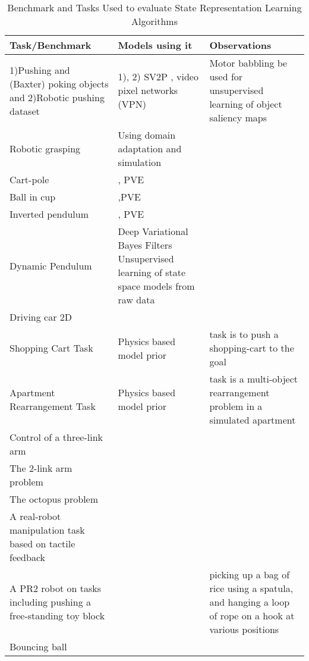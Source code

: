 \documentclass[a4paper]{article}
\begin{document}
\begin{table}[!htbp]%
\centering
\caption{Benchmark and Tasks Used to evaluate State Representation Learning Algorithms}
\label{tab:benchmarks}
\begin{tabular}{p{49mm}|p{55mm}|p{55mm}}
\textbf{Task/Benchmark} & \textbf{ Models using it} &\textbf{Observations}\\\hline\hline
1)Pushing and (Baxter) poking objects and 2)Robotic pushing dataset  & 1)\cite{Peng17,Agrawal16}, 2) SV2P \cite{Babaeizadeh17}, video pixel networks (VPN) \cite{Kalchbrenner16,Reed17} & Motor babbling be used for unsupervised learning of object saliency maps \cite{LeGoff17}
\\\hline
Robotic grasping & Using domain adaptation and simulation \cite{Bousmalis17} & \\\hline
Cart-pole  & \cite{Watter15}, PVE \cite{Jonschkowski17}  & \\\hline 
Ball in cup &  \cite{Kim17},PVE \cite{Jonschkowski17}  & \\\hline
Inverted pendulum  & \cite{Watter15}, PVE \cite{Jonschkowski17}  &  \\\hline
Dynamic Pendulum  & Deep Variational Bayes Filters Unsupervised learning of state space models from raw data \cite{Karl16}  &   \\\hline
Driving car 2D  & \cite{Jonschkowski15} &  \\\hline
Shopping Cart Task  & Physics based  model prior \cite{Scholz14} & task is to push a shopping-cart to the goal  \\\hline
Apartment Rearrangement Task  & Physics based  model prior\cite{Scholz14} & task is a multi-object rearrangement problem in a simulated  apartment
\\\hline
Control of a three-link arm  & \cite{Watter15}  & \\\hline
The 2-link arm problem  & \cite{Munk16} & \\\hline
The octopus problem  & \cite{Munk16} & \\\hline
A real-robot manipulation task based on tactile feedback  & \cite{Hoof16} & \\\hline
A PR2 robot on tasks including pushing a free-standing toy block & \cite{Finn15} & picking up a bag of rice using a spatula, and hanging a loop of rope on a hook at various positions     \\\hline
Bouncing ball   & \cite{Karl16}   & \\\hline

\end{tabular}
\end{table}
\end{document}
